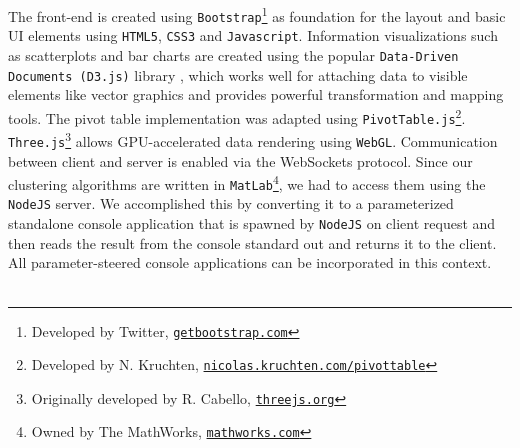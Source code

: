 \documentclass[journal]{style/vgtc} 			          %
\begin{document}
The front-end is created using \texttt{Bootstrap}\footnote{Developed by Twitter, \href{http://getbootstrap.com}{\texttt{getbootstrap.com}}} as foundation for the layout and basic UI elements using \texttt{HTML5}, \texttt{CSS3} and \texttt{Javascript}.
%
Information visualizations such as scatterplots and bar charts are created using the popular \texttt{Data-Driven Documents (D3.js)} library \cite{D3}, which works well for attaching data to visible elements like vector graphics and provides powerful transformation and mapping tools.
%
The pivot table implementation was adapted using \texttt{PivotTable.js}\footnote{Developed by N. Kruchten, \href{http://nicolas.kruchten.com/pivottable}{\texttt{nicolas.kruchten.com/pivottable}}}.
%
\texttt{Three.js}\footnote{Originally developed by R. Cabello, \href{http://threejs.org}{\texttt{threejs.org}}} allows GPU-accelerated data rendering using \texttt{WebGL}.
%
Communication between client and server is enabled via the WebSockets protocol.
%
Since our clustering algorithms are written in \texttt{MatLab}\footnote{Owned by The MathWorks, \href{http://mathworks.com}{\texttt{mathworks.com}}}, we had to access them using the \texttt{NodeJS} server.
%
We accomplished this by converting it to a parameterized standalone console application that is spawned by \texttt{NodeJS} on client request and then reads the result from the console standard out and returns it to the client.
%
All parameter-steered console applications can be incorporated in this context.
\\\\
\end{document}
